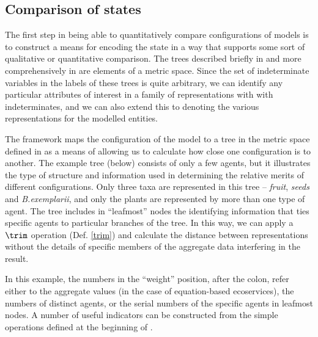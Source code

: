 \subsection{Comparison of states}
The first step in being able to quantitatively compare configurations
of models is to construct a means for encoding the state in a way that
supports some sort of qualitative or quantitative comparison.  The
trees described briefly in \Cthree and more comprehensively in \Cfour
are elements of a metric space. Since the set of indeterminate
variables in the labels of these trees is quite arbitrary, we can
identify any particular attributes of interest in a family of
representations with with indeterminates, and we can also extend this
to denoting the various representations for the modelled entities.

The framework maps the configuration of the model to a tree in the
metric space defined in \Cfour as a means of allowing us to
calculate how close one configuration is to another.  The example tree
(below) consists of only a few agents, but it illustrates the
type of structure and information used in determining the relative
merits of different configurations. Only three taxa are represented in
this tree -- \emph{fruit}, \emph{seeds} and \emph{B.exemplarii}, and
only the plants are represented by more than one type of agent.
The tree includes in ``leafmost'' nodes the identifying information
that ties specific agents to particular branches of the tree.  In this
way, we can apply a $\trim$ operation (Def. \ref{trim}) and calculate
the distance between representations without the details of specific
members of the aggregate data interfering in the result.

In this example, the numbers in the ``weight'' position, after the
colon, refer either to the aggregate values (in the case of
equation-based ecoservices), the numbers of distinct agents, or the
serial numbers of the specific agents in leafmost nodes.  A number of
useful indicators can be constructed from the simple operations
defined at the beginning of \Cfour.

